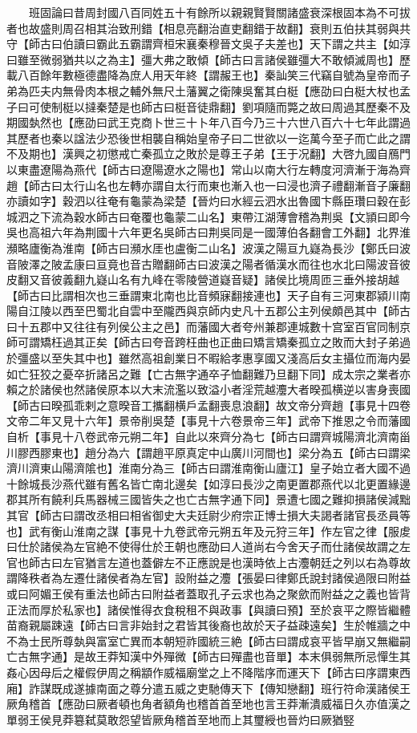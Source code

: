 　　班固論曰昔周封國八百同姓五十有餘所以親親賢賢關諸盛衰深根固本為不可拔者也故盛則周召相其治致刑錯【相息亮翻治直吏翻錯于故翻】衰則五伯扶其弱與共守【師古曰伯讀曰霸此五霸謂齊桓宋襄秦穆晉文吳子夫差也】天下謂之共主【如淳曰雖至微弱猶共以之為主】彊大弗之敢傾【師古曰言諸侯雖彊大不敢傾滅周也】歷載八百餘年數極德盡降為庶人用天年終【謂赧王也】秦訕笑三代竊自號為皇帝而子弟為匹夫内無骨肉本根之輔外無尺土藩翼之衛陳吳奮其白梃【應劭曰白梃大杖也孟子曰可使制梃以撻秦楚是也師古曰梃音徒鼎翻】劉項隨而斃之故曰周過其歷秦不及期國埶然也【應劭曰武王克商卜世三十卜年八百今乃三十六世八百六十七年此謂過其歷者也秦以諡法少恐後世相襲自稱始皇帝子曰二世欲以一迄萬今至子而亡此之謂不及期也】漢興之初懲戒亡秦孤立之敗於是尊王子弟【王于况翻】大啓九國自鴈門以東盡遼陽為燕代【師古曰遼陽遼水之陽也】常山以南大行左轉度河濟漸于海為齊趙【師古曰太行山名也左轉亦謂自太行而東也漸入也一曰浸也濟子禮翻漸音子廉翻亦讀如字】穀泗以往奄有龜蒙為梁楚【晉灼曰水經云泗水出魯國卞縣臣瓚曰穀在彭城泗之下流為穀水師古曰奄覆也龜蒙二山名】東帶江湖薄會稽為荆吳【文頴曰即今吳也高祖六年為荆國十六年更名吳師古曰荆吳同是一國薄伯各翻會工外翻】北界淮瀕略廬衡為淮南【師古曰瀕水厓也盧衡二山名】波漢之陽亘九嶷為長沙【鄭氏曰波音陂澤之陂孟康曰亘竟也音古贈翻師古曰波漢之陽者循漢水而往也水北曰陽波音彼皮翻又音彼義翻九嶷山名有九峰在零陵營道嶷音疑】諸侯比境周匝三垂外接胡越【師古曰比謂相次也三垂謂東北南也比音頻寐翻接連也】天子自有三河東郡潁川南陽自江陵以西至巴蜀北自雲中至隴西與京師内史凡十五郡公主列侯頗邑其中【師古曰十五郡中又往往有列侯公主之邑】而藩國大者夸州兼郡連城數十宫室百官同制京師可謂矯枉過其正矣【師古曰夸音跨枉曲也正曲曰矯言矯秦孤立之敗而大封子弟過於彊盛以至失其中也】雖然高祖創業日不暇給孝惠享國又淺高后女主攝位而海内晏如亡狂狡之憂卒折諸呂之難【亡古無字通卒子恤翻難乃旦翻下同】成太宗之業者亦賴之於諸侯也然諸侯原本以大末流濫以致溢小者淫荒越灋大者暌孤横逆以害身喪國【師古曰暌孤乖剌之意暌音工攜翻横戶孟翻喪息浪翻】故文帝分齊趙【事見十四卷文帝二年又見十六年】景帝削吳楚【事見十六卷景帝三年】武帝下推恩之令而藩國自析【事見十八卷武帝元朔二年】自此以來齊分為七【師古曰謂齊城陽濟北濟南甾川膠西膠東也】趙分為六【謂趙平原真定中山廣川河間也】梁分為五【師古曰謂梁濟川濟東山陽濟隂也】淮南分為三【師古曰謂淮南衡山廬江】皇子始立者大國不過十餘城長沙燕代雖有舊名皆亡南北邊矣【如淳曰長沙之南更置郡燕代以北更置緣邊郡其所有饒利兵馬器械三國皆失之也亡古無字通下同】景遭七國之難抑損諸侯減黜其官【師古曰謂改丞相曰相省御史大夫廷尉少府宗正博士損大夫謁者諸官長丞員等也】武有衡山淮南之謀【事見十九卷武帝元朔五年及元狩三年】作左官之律【服䖍曰仕於諸侯為左官絶不使得仕於王朝也應劭曰人道尚右今舍天子而仕諸侯故謂之左官也師古曰左官猶言左道也蓋僻左不正應說是也漢時依上古灋朝廷之列以右為尊故謂降秩者為左遷仕諸侯者為左官】設附益之灋【張晏曰律鄭氏說封諸侯過限曰附益或曰阿媚王侯有重法也師古曰附益者蓋取孔子云求也為之聚歛而附益之之義也皆背正法而厚於私家也】諸侯惟得衣食稅租不與政事【與讀曰預】至於哀平之際皆繼體苗裔親屬踈遠【師古曰言非始封之君皆其後裔也故於天子益疎遠矣】生於帷牆之中不為士民所尊埶與富室亡異而本朝短祚國統三絶【師古曰謂成哀平皆早崩又無繼嗣亡古無字通】是故王莽知漢中外殫微【師古曰殫盡也音單】本末俱弱無所忌憚生其姦心因母后之權假伊周之稱顓作威福廟堂之上不降階序而運天下【師古曰序謂東西廂】詐謀既成遂據南面之尊分遣五威之吏馳傳天下【傳知戀翻】班行符命漢諸侯王厥角稽首【應劭曰厥者頓也角者額角也稽首首至地也言王莽漸潰威福日久亦值漢之單弱王侯見莽簒弑莫敢怨望皆厥角稽首至地而上其璽綬也晉灼曰厥猶竪